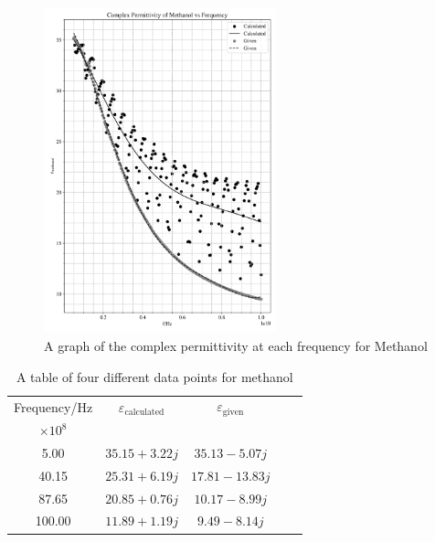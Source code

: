 \documentclass[12pt, a4paper]{article}
\begin{document}
\begin{figure}[H]
    \centering
    \includegraphics[width = 0.6\textwidth]{Plot1.png}\caption{A graph of the complex permittivity at each frequency for Methanol}\label{fig: Methanol Graph}
\end{figure}

\begin{table}[H]
    \centering
    \begin{tabular}{ccccc}
    \hline
    Frequency/Hz &
      \(\varepsilon_{\mathrm{calculated}}\) &
      \(\varepsilon_{\mathrm{given}}\) \\
      \(\times 10^8\)& & \\ \hline \hline
      5.00   & \(35.15+3.22j\)  & \(35.13-5.07j\)  \\
      40.15  & \(25.31+6.19j\)  & \(17.81-13.83j\) \\
      87.65  & \(20.85+0.76j\)  & \(10.17-8.99j\)  \\
      100.00 & \(11.89+1.19j\)  & \(9.49-8.14j\)   \\
      \hline
    \end{tabular}
    \caption{A table of four different data points for methanol}\label{tab: Table 1}
\end{table}
\end{document}
